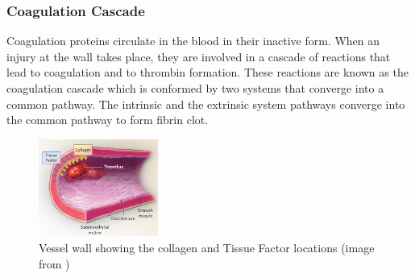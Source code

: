 \documentclass[%
 nofootinbib,
 amsmath,amssymb,
 aps,
 pra,
]{revtex4-1}
\begin{document}
\subsubsection{Coagulation Cascade}
Coagulation proteins circulate in the blood in their inactive form. When an injury at the wall takes place, they are involved in a cascade of reactions that lead to coagulation and to thrombin formation. These reactions are known as the coagulation cascade which is conformed by two systems that converge into a common pathway. The intrinsic and the extrinsic system pathways converge into the common pathway to form fibrin clot.\\
\begin{figure}[h]
\includegraphics[width=0.35\textwidth]{Figures/Furie.png}
\caption{\label{sec:fur} Vessel wall showing the collagen and Tissue Factor locations (image from \citet{Furie:2008})}
\end{figure} 
\end{document}
